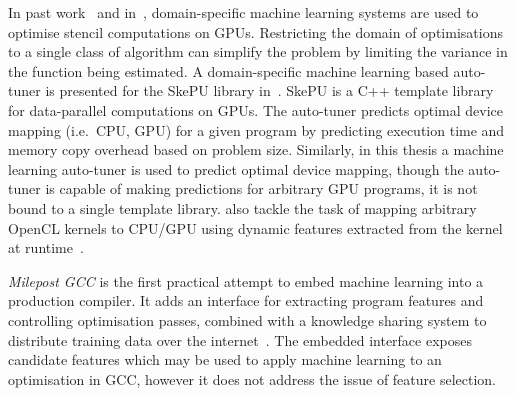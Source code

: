 %
In past work~\cite{Cummins2016a} and in~\cite{Lutz2013}, domain-specific  machine learning systems are used to optimise stencil computations on GPUs. Restricting the domain of optimisations to a single class of algorithm can simplify the problem by limiting the variance in the function being estimated.
A domain-specific machine learning based auto-tuner is presented for the SkePU library in~\cite{Dastgeer2011b}. SkePU is a C++ template library for data-parallel computations on GPUs. The auto-tuner predicts optimal device mapping (i.e.\ CPU, GPU) for a given program by predicting execution time and memory copy overhead based on problem size. Similarly, in this thesis a machine learning auto-tuner is used to predict optimal device mapping, though the auto-tuner is capable of making predictions for arbitrary GPU programs, it is not bound to a single template library.
\citeauthor{Moren2018} also tackle the task of mapping arbitrary OpenCL kernels to CPU/GPU using dynamic features extracted from the kernel at runtime~\cite{Moren2018}.


\emph{Milepost GCC} is the first practical attempt to embed machine learning into a production compiler. It adds an interface for extracting program features and controlling optimisation passes, combined with a knowledge sharing system to distribute training data over the internet~\cite{Fursin2011}. The embedded interface exposes candidate features which may be used to apply machine learning to an optimisation in GCC, however it does not address the issue of feature selection.

